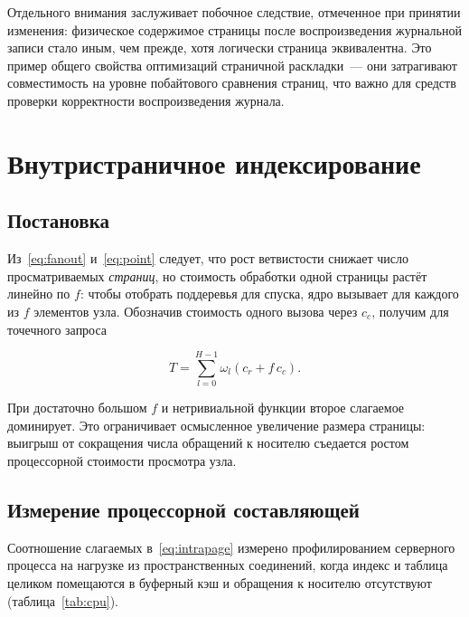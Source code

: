 Отдельного внимания заслуживает побочное следствие, отмеченное при принятии
изменения: физическое содержимое страницы после воспроизведения журнальной
записи стало иным, чем прежде, хотя логически страница эквивалентна. Это пример
общего свойства оптимизаций страничной раскладки~--- они затрагивают
совместимость на уровне побайтового сравнения страниц, что важно для средств
проверки корректности воспроизведения журнала.

\section{Внутристраничное индексирование}
\label{sec:intrapage}

\subsection{Постановка}

Из~\eqref{eq:fanout} и~\eqref{eq:point} следует, что рост ветвистости снижает
число просматриваемых \emph{страниц}, но стоимость обработки одной страницы
растёт линейно по $f$: чтобы отобрать поддеревья для спуска, ядро вызывает
 для каждого из $f$ элементов узла. Обозначив стоимость одного
вызова через $c_c$, получим для точечного запроса

\begin{equation}
\label{eq:intrapage}
T = \sum_{l=0}^{H-1} \omega_l \left( c_r + f\,c_c \right).
\end{equation}

При достаточно большом $f$ и нетривиальной функции  второе
слагаемое доминирует. Это ограничивает осмысленное увеличение размера страницы:
выигрыш от сокращения числа обращений к носителю съедается ростом процессорной
стоимости просмотра узла.

\subsection{Измерение процессорной составляющей}
\label{sec:cpu-profile}

Соотношение слагаемых в~\eqref{eq:intrapage} измерено профилированием
серверного процесса на нагрузке из пространственных соединений, когда индекс и
таблица целиком помещаются в буферный кэш и обращения к носителю отсутствуют
(таблица~\ref{tab:cpu}).

